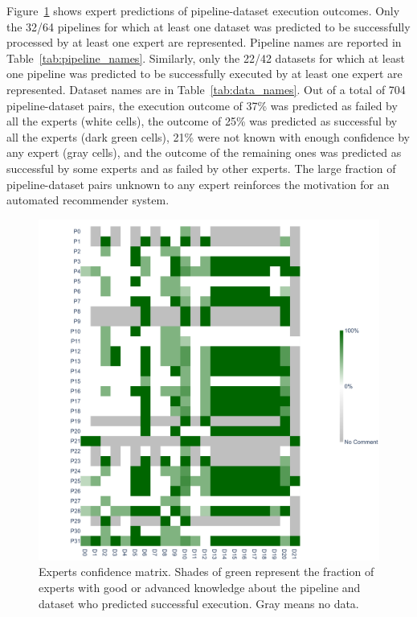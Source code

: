 \documentclass[conference]{IEEEtran}
\begin{document}
Figure~\ref{fig:experts_matrix} shows expert predictions of
pipeline-dataset execution outcomes. Only the 32/64 pipelines for which at
least one dataset was predicted to be successfully processed by at least
one expert are represented. Pipeline names are reported in
Table~\ref{tab:pipeline_names}. Similarly, only the 22/42 datasets for which
at least one pipeline was predicted to be successfully executed by at least
one expert are represented. Dataset names are in Table~\ref{tab:data_names}. Out of a total of 704 pipeline-dataset pairs,
the execution outcome of 37\% was predicted as failed by all the experts
(white cells), the outcome of 25\% was predicted as successful by all the
experts (dark green cells), 21\% were not known with enough confidence by
any expert (gray cells), and the outcome of the remaining ones was
predicted as successful by some experts and as failed by other experts. The
large fraction of pipeline-dataset pairs unknown to any expert reinforces
the motivation for an automated recommender system.
\begin{figure}
\centering
  \includegraphics[width=\columnwidth]{figures/Commented Success Percentage.png}
  \caption{Experts confidence matrix. Shades of green represent the fraction of experts with good or advanced knowledge about the pipeline and dataset who predicted successful execution. Gray means no data.}
  \label{fig:experts_matrix}
\end{figure}
\end{document}
